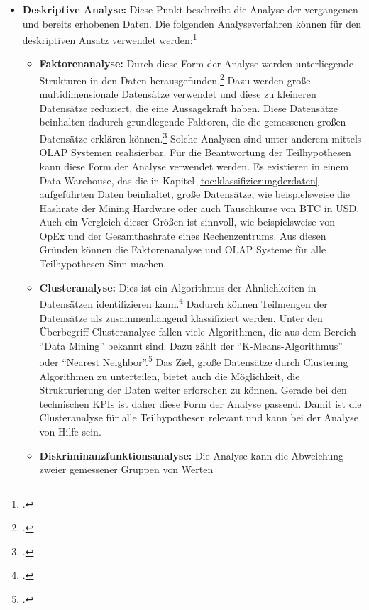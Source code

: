 \begin{itemize}
    \item \textbf{Deskriptive Analyse: }Diese Punkt beschreibt die Analyse der vergangenen und bereits erhobenen
    Daten. Die folgenden Analyseverfahren können für den deskriptiven Ansatz verwendet
    werden:\footcite[Cf.][pp. 97]{bihani2014comparative}
    \begin{itemize}
        \item \textbf{Faktorenanalyse: }Durch diese Form der Analyse werden unterliegende Strukturen in den Daten
        herausgefunden.\footcite[Cf.][pp. 97]{bihani2014comparative} Dazu werden große multidimensionale Datensätze verwendet
        und diese zu kleineren Datensätze reduziert, die eine Aussagekraft haben. Diese Datensätze beinhalten dadurch
        grundlegende Faktoren, die die gemessenen großen Datensätze erklären
        können.\footcite[Cf.][pp. 97]{bihani2014comparative} Solche Analysen sind unter anderem mittels \ac{OLAP} Systemen
        realisierbar. Für die Beantwortung der Teilhypothesen kann diese Form der Analyse verwendet werden. Es existieren
        in einem Data Warehouse, das die in Kapitel \ref{toc:klassifizierungderdaten} aufgeführten Daten beinhaltet, große
        Datensätze, wie beispielsweise die Hashrate der Mining Hardware oder auch Tauschkurse von \ac{BTC} in \ac{USD}. Auch
        ein Vergleich dieser Größen ist sinnvoll, wie beispielsweise von \ac{OpEx} und der Gesamthashrate eines Rechenzentrums.
        Aus diesen Gründen können die Faktorenanalyse und \ac{OLAP} Systeme für alle Teilhypothesen Sinn machen.
        \item \textbf{Clusteranalyse: }Dies ist ein Algorithmus der Ähnlichkeiten in Datensätzen identifizieren
        kann.\footcite[Cf.][p. 98]{bihani2014comparative} Dadurch können Teilmengen der Datensätze als zusammenhängend
        klassifiziert werden. Unter den Überbegriff Clusteranalyse fallen viele Algorithmen, die aus dem Bereich "`Data Mining"'
        bekannt sind. Dazu zählt der "`K-Means-Algorithmus"' oder "`Nearest Neighbor"'.\footcite[Cf.][p. 98]{bihani2014comparative}
        Das Ziel, große Datensätze durch Clustering Algorithmen zu unterteilen, bietet auch die Möglichkeit, die Strukturierung
        der Daten weiter erforschen zu können. Gerade bei den technischen \acp{KPI} ist daher diese Form der Analyse passend.
        Damit ist die Clusteranalyse für alle Teilhypothesen relevant und kann bei der Analyse von Hilfe sein. 
        \item \textbf{Diskriminanzfunktionsanalyse: }Die Analyse kann die Abweichung zweier gemessener Gruppen von Werten

\end{itemize}
\end{itemize}
